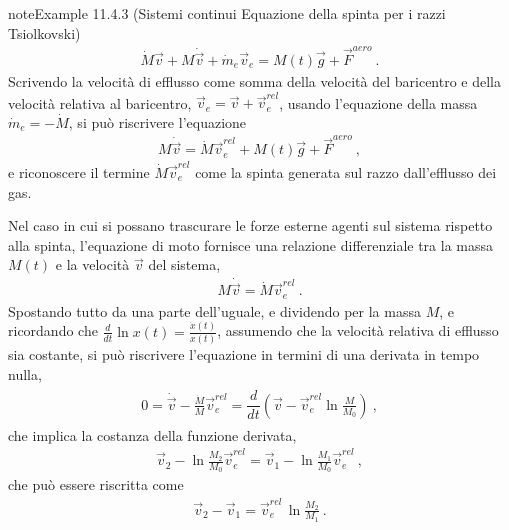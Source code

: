 \documentclass[letterpaper,10pt,italian]{jupyterBook}
\begin{document}
\begin{sphinxadmonition}{note}{Example 11.4.3 (Sistemi continui \sphinxhyphen{} Equazione della spinta per i razzi \sphinxhyphen{} Tsiolkovski)}
\begin{equation*}
\begin{split}\dot{M} \vec{v} + M \dot{\vec{v}} + \dot{m}_e \vec{v}_e = M(t) \vec{g} + \vec{F}^{aero} \ .\end{split}
\end{equation*}
\sphinxAtStartPar
Scrivendo la velocità di efflusso come somma della velocità del baricentro e della velocità relativa al baricentro, \(\vec{v}_e = \vec{v} + \vec{v}_e^{rel}\), usando l’equazione della massa \(\dot{m}_e = - \dot{M}\), si può riscrivere l’equazione
\begin{equation*}
\begin{split}M \dot{\vec{v}} = \dot{M} \vec{v}_e^{rel} + M(t) \vec{g} + \vec{F}^{aero} \ ,\end{split}
\end{equation*}
\sphinxAtStartPar
e riconoscere il termine \(\dot{M} \vec{v}_e^{rel}\) come la spinta generata sul razzo dall’efflusso dei gas.

\sphinxAtStartPar
Nel caso in cui si possano trascurare le forze esterne agenti sul sistema rispetto alla spinta, l’equazione di moto fornisce una relazione differenziale tra la massa \(M(t)\) e la velocità \(\vec{v}\) del sistema,
\begin{equation*}
\begin{split}M \dot{\vec{v}} = \dot{M} \vec{v}_e^{rel} \ .\end{split}
\end{equation*}
\sphinxAtStartPar
Spostando tutto da una parte dell’uguale, e dividendo per la massa \(M\), e ricordando che \(\frac{d}{dt} \ln x(t) = \frac{\dot{x}(t)}{x(t)}\), assumendo che la velocità relativa di efflusso sia costante, si può riscrivere l’equazione in termini di una derivata in tempo nulla,
\begin{equation*}
\begin{split}\begin{aligned}
  0 = \dot{\vec{v}} - \frac{\dot{M}}{M} \vec{v}_e^{rel} = \dfrac{d}{dt} \left( \vec{v} - \vec{v}^{rel}_e \ln \frac{M}{M_0} \right) \ ,
\end{aligned}\end{split}
\end{equation*}
\sphinxAtStartPar
che implica la costanza della funzione derivata,
\begin{equation*}
\begin{split}\vec{v}_2 - \ln \frac{M_2}{M_0} \vec{v}^{rel}_e = \vec{v}_1 - \ln \frac{M_1}{M_0} \vec{v}^{rel}_e \ ,\end{split}
\end{equation*}
\sphinxAtStartPar
che può essere riscritta come
\begin{equation*}
\begin{split}\vec{v}_2 - \vec{v}_1 =  \vec{v}^{rel}_e \, \ln \frac{M_2}{M_1}\ .\end{split}
\end{equation*}\end{sphinxadmonition}
\end{document}
